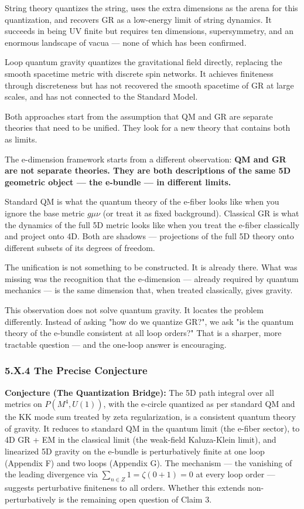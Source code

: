 \documentclass[aps,prd,preprint,superscriptaddress,longbibliography,floatfix]{revtex4-2}
\theoremstyle{remark}
\begin{document}
String theory quantizes the string, uses the extra dimensions as the arena for this quantization, and recovers GR as a low-energy limit of string dynamics. It succeeds in being UV finite but requires ten dimensions, supersymmetry, and an enormous landscape of vacua --- none of which has been confirmed.

Loop quantum gravity quantizes the gravitational field directly, replacing the smooth spacetime metric with discrete spin networks. It achieves finiteness through discreteness but has not recovered the smooth spacetime of GR at large scales, and has not connected to the Standard Model.

Both approaches start from the assumption that QM and GR are separate theories that need to be unified. They look for a new theory that contains both as limits.

The e-dimension framework starts from a different observation: \textbf{QM and GR are not separate theories. They are both descriptions of the same 5D geometric object --- the e-bundle --- in different limits.}

Standard QM is what the quantum theory of the e-fiber looks like when you ignore the base metric $g\mu\nu$ (or treat it as fixed background). Classical GR is what the dynamics of the full 5D metric looks like when you treat the e-fiber classically and project onto 4D. Both are shadows --- projections of the full 5D theory onto different subsets of its degrees of freedom.

The unification is not something to be constructed. It is already there. What was missing was the recognition that the e-dimension --- already required by quantum mechanics --- is the same dimension that, when treated classically, gives gravity.

This observation does not solve quantum gravity. It locates the problem differently. Instead of asking "how do we quantize GR?", we ask "is the quantum theory of the e-bundle consistent at all loop orders?" That is a sharper, more tractable question --- and the one-loop answer is encouraging.



\subsubsection{5.X.4 The Precise Conjecture}

\textbf{Conjecture (The Quantization Bridge):} The 5D path integral over all metrics on $P(M^{4}, U(1))$, with the e-circle quantized as per standard QM and the KK mode sum treated by zeta regularization, is a consistent quantum theory of gravity. It reduces to standard QM in the quantum limit (the e-fiber sector), to 4D GR + EM in the classical limit (the weak-field Kaluza-Klein limit), and linearized 5D gravity on the e-bundle is perturbatively finite at one loop (Appendix F) and two loops (Appendix G). The mechanism --- the vanishing of the leading divergence via $\sum_{n\in Z} 1 = \zeta(0+1) = 0$ at every loop order --- suggests perturbative finiteness to all orders. Whether this extends non-perturbatively is the remaining open question of Claim 3.
\end{document}
